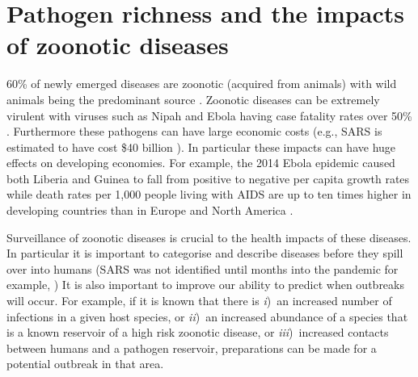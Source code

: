 
\section{Pathogen richness and the impacts of zoonotic diseases}




60\% of newly emerged diseases are zoonotic (acquired from animals) with wild animals being the predominant source \cite{jones2008global, woolhouse2006host, taylor2001risk}.
Zoonotic diseases can be extremely virulent with viruses such as Nipah  and Ebola having case fatality rates over 50\% \cite{luby2009recurrent, lefebvre2014case}.
Furthermore these pathogens can have large economic costs (e.g., SARS is estimated to have cost \$40 billion \cite{knobler2004learning}).
In particular these impacts can have huge effects on developing economies.
For example, the 2014 Ebola epidemic caused both Liberia and Guinea to fall from positive to negative per capita growth rates \cite{ebolaWorldbank, ebola2015worldbank} while death rates per 1,000 people living with AIDS are up to ten times higher in developing countries than in Europe and North America \cite{granich2015trends}.


Surveillance of zoonotic diseases is crucial to the health impacts of these diseases.
In particular it is important to categorise and describe diseases before they spill over into humans (SARS was not identified until months into the pandemic for example, \textcite{drosten2003identification}) 
It is also important to improve our ability to predict when outbreaks will occur. 
For example, if it is known that there is \textit{i})~an increased number of infections in a given host species, or \textit{ii})~an increased abundance of a species that is a known reservoir of a high risk zoonotic disease, or \textit{iii})~increased contacts between humans and a pathogen reservoir, preparations can be made for a potential outbreak in that area.

